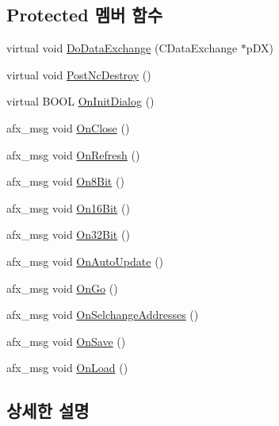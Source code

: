 \subsection*{Protected 멤버 함수}
\begin{DoxyCompactItemize}
\item 
virtual void \mbox{\hyperlink{class_memory_viewer_dlg_aeee7f9087554df8563689ab22facbbd6}{Do\+Data\+Exchange}} (C\+Data\+Exchange $\ast$p\+DX)
\item 
virtual void \mbox{\hyperlink{class_memory_viewer_dlg_a3dd16d8770e7b5d3e174c9630ca4ecb8}{Post\+Nc\+Destroy}} ()
\item 
virtual B\+O\+OL \mbox{\hyperlink{class_memory_viewer_dlg_a2061415e67d04b0c157ba2bd50a8c56c}{On\+Init\+Dialog}} ()
\item 
afx\+\_\+msg void \mbox{\hyperlink{class_memory_viewer_dlg_a49522f159a0ccbca8c511e5c248b9b93}{On\+Close}} ()
\item 
afx\+\_\+msg void \mbox{\hyperlink{class_memory_viewer_dlg_a2c10fa49648424e4994c8c5a71f4effc}{On\+Refresh}} ()
\item 
afx\+\_\+msg void \mbox{\hyperlink{class_memory_viewer_dlg_ad408c6c194db416a0cf23480184ef610}{On8\+Bit}} ()
\item 
afx\+\_\+msg void \mbox{\hyperlink{class_memory_viewer_dlg_a61f6aec84a4bcf908dc32f9e85c871d0}{On16\+Bit}} ()
\item 
afx\+\_\+msg void \mbox{\hyperlink{class_memory_viewer_dlg_afb8178dcad55d86c9217f89e0ed4814f}{On32\+Bit}} ()
\item 
afx\+\_\+msg void \mbox{\hyperlink{class_memory_viewer_dlg_abd1a90d5974c83a3b388043d6162f118}{On\+Auto\+Update}} ()
\item 
afx\+\_\+msg void \mbox{\hyperlink{class_memory_viewer_dlg_aa21f28b3490b179e79e3a3687fef0c45}{On\+Go}} ()
\item 
afx\+\_\+msg void \mbox{\hyperlink{class_memory_viewer_dlg_ab7624247967998f1973da99a035a28e3}{On\+Selchange\+Addresses}} ()
\item 
afx\+\_\+msg void \mbox{\hyperlink{class_memory_viewer_dlg_aaa3651f618355f6d1d3bf3158cb9c812}{On\+Save}} ()
\item 
afx\+\_\+msg void \mbox{\hyperlink{class_memory_viewer_dlg_adfc256215ade1d48a24a3eb72b3ecfed}{On\+Load}} ()
\end{DoxyCompactItemize}


\subsection{상세한 설명}


